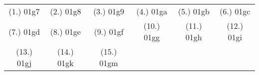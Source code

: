 \begin{eocexercises}{}



\par \practiceinfo
\par \begin{tabular}[h]{cccccc}
(1.)	01g7	&
(2.)	01g8	&
(3.)	01g9	&
(4.)	01ga	&
(5.)	01gb	&
(6.)	01gc	\\ %
(7.)	01gd	&
(8.)	01ge	&
(9.)	01gf	&
(10.)	01gg	&
(11.)	01gh	&
(12.)	01gi	\\ %
(13.)	01gj	&
(14.)	01gk	&
(15.)	01gm	&
\end{tabular}
\end{eocexercises}
